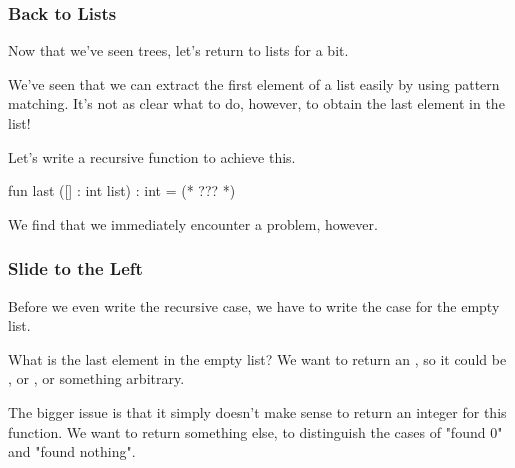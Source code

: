 \documentclass[aspectratio=169, handout]{beamer}
\begin{document}

\begin{frame}[fragile]
  \frametitle{Back to Lists}

  Now that we've seen trees, let's return to lists for a bit.

  \pause
  \vspace{\fill}

  We've seen that we can extract the first element of a list easily by
  using pattern matching. It's not as clear what to do, however, to obtain
  the last element in the list!

  \pause
  \vspace{\fill}

  Let's write a recursive  function to achieve this.

  \pause
  \begin{codeblock}
    fun last ([] : int list) : int = (* ??? *)
  \end{codeblock}

  \pause
  \vspace{\fill}

  We find that we immediately encounter a problem, however.
\end{frame}

\begin{frame}[fragile]
  \frametitle{Slide to the Left}

  Before we even write the recursive case, we have to write the case for
  the empty list.

  \pause
  \vspace{\fill}

  What is the last element in the empty list? We want to return an
  , so it could be , or , or something arbitrary.

  \pause
  \vspace{\fill}

  The bigger issue is that it simply doesn't make sense to return an integer
  for this function. We want to return something else, to distinguish the
  cases of "found 0" and "found nothing".
\end{frame}
\end{document}

